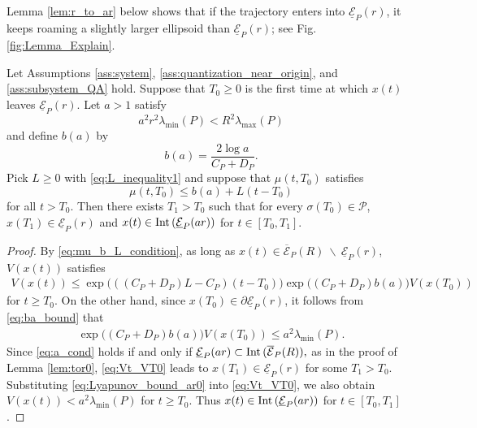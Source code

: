 \documentclass[a4, 11pt]{article}
\newcommand{\Int}{\mathop{\rm Int~\!}}
\begin{document}
Lemma \ref{lem:r_to_ar} below shows that if 
the trajectory enters into $\underline{\mathcal{E}}_P(r)$,
it keeps roaming a slightly larger ellipsoid than 
$\underline{\mathcal{E}}_P(r)$; see Fig. \ref{fig:Lemma_Explain}.  
\begin{lemma}
\label{lem:r_to_ar}
Let Assumptions \ref{ass:system}, \ref{ass:quantization_near_origin}, and
\ref{ass:subsystem_QA} hold.
Suppose that $T_0 \geq 0$ is the first time at which
$x(t)$ leaves $\underline{\mathcal{E}}_P(r)$.
Let $a > 1$ satisfy 
\begin{equation}
\label{eq:a_cond}
a^2r^2 \lambda_{\min}(P)
< R^2\lambda_{\max}(P)
\end{equation}
and define $b(a)$ by
\begin{equation}
\label{eq:ba_bound}
b(a) =
\frac{2\log a}{C_P + D_P}.
\end{equation}
Pick $L \geq 0$ with \eqref{eq:L_inequality1} and
suppose that $\mu(t,T_0)$ satisfies
\begin{equation}
\label{eq:mu_b_L_condition}
\mu(t,T_0) \leq b(a) + L(t-T_0)
\end{equation}
for all $t > T_0$. Then
there exists $T_{1} > T_0$ such that 
for every $\sigma(T_0) \in \mathcal{P}$,
$x(T_1) \in \underline{\mathcal{E}}_P(r)$ and
$x (t) \in \Int(\underline{\mathcal{E}}_P(ar))$ 
for $t \in [T_0, T_1]$.
\end{lemma}
\begin{proof}
By \eqref{eq:mu_b_L_condition},
as long as $x(t)\in
\overline{\mathcal{E}}_P(R)~\backslash~\underline{\mathcal{E}}_P(r)$,
$V(x(t))$ satisfies
\begin{align}
V(x(t)) \leq 
\exp\big( 
\left(
\left(
C_P+ D_P \right)L - 
C_P
\right) (t - T_0)
\big) 
\exp\big(
\left(C_P  + D_P\right)b(a)
\big) V(x(T_0) ) \label{eq:Vt_VT0}
\end{align}
for $t \geq T_0$.
On the other hand,
since $x(T_0) \in \partial \underline{\mathcal{E}}_P(r) $,
it follows from \eqref{eq:ba_bound} that
\begin{align}
\label{eq:Lyapunov_bound_ar0}
\exp\big(
\left(C_P + D_P\right)b(a)
\big) V(x(T_0) ) 
\leq a^2 \lambda_{\min}(P).
\end{align}
Since \eqref{eq:a_cond} holds if and only if
$
\underline{\mathcal{E}}_P(ar) 
\subset \Int (\overline{\mathcal{E}}_P(R)),
$
as in the proof of Lemma \ref{lem:tor0}, \eqref{eq:Vt_VT0} leads to
$x(T_1) \in \underline{\mathcal{E}}_P(r)$ for some
$T_1 > T_0$.
Substituting \eqref{eq:Lyapunov_bound_ar0} into \eqref{eq:Vt_VT0},
we also obtain 
$V(x(t)) < a^2\lambda_{\min}(P)$ for $t \geq T_0$. 
Thus
$x(t) \in \Int (\underline{\mathcal{E}}_P(ar))$ 
for $t \in [T_0, T_1]$.
\end{proof}
\end{document}
